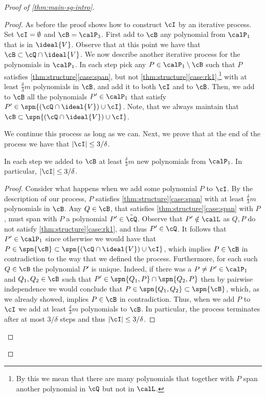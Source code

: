 \begin{proof}[Proof of \autoref{thm:main-sg-intro}]
\begin{proof}
As before the proof shows how to construct $\cI$ by an iterative process. 
Set $\cI= \emptyset$ and $\cB=\calP_3$. First add to $\cB$ any polynomial from $\calP_1$ that is in $\ideal{V}$. Observe that at this point we have that $\cB\subset \cQ\cap \ideal{V}$. We now describe another iterative process for the polynomials in $\calP_1$.
In each step pick any $P \in \calP_1\setminus \cB$ such that $P$ satisfies \autoref{thm:structure}\ref{case:span}, but not \autoref{thm:structure}\ref{case:rk1},\footnote{By this we mean that there are many polynomials that together with $P$ span another polynomial in $\cQ$ but not in $\calL$.} with at least $\frac{\delta}{3}m$ polynomials in $\cB$, and add it to both $\cI$ and to $\cB$. Then, we add to $\cB$ all the polynomials $P'\in\calP_1$ that satisfy $P' \in \spn{(\cQ \cap \ideal{V})  \cup \cI}$. Note, that we always maintain that  $\cB \subset \spn{(\cQ \cap \ideal{V})  \cup \cI}$.

We continue this process as long as we can.
Next, we prove that at the end of the process we have that $|\cI| \leq 3/\delta$.

\begin{claim}\label{cla:2nd-proc}
In each step we added to $\cB$ at least $\frac{\delta}{3}m$ new polynomials from $\calP_1$. In particular, $|\cI| \leq 3/\delta$.
\end{claim}
\begin{proof}
Consider what happens when we add some polynomial $P$ to $\cI$. By the description of our process, $P$ satisfies \autoref{thm:structure}\ref{case:span} with at least $\frac{\delta}{3}m$ polynomials in $\cB$. Any $Q\in  \cB$, that satisfies \autoref{thm:structure}\ref{case:span} with $P$,  must span with $P$ a polynomial $P'\in \tilde{\cQ}$. Observe that $P' \notin \calL$ as $Q,P$ do not satisfy \autoref{thm:structure}\ref{case:rk1}, and thus  $P'\in\cQ$. It follows that $P'\in \calP_1$ since otherwise we would have that $P\in \spn{\cB}\subset  \spn{(\cQ\cap \ideal{V}) \cup \cI}$, which implies $P\in\cB$ in contradiction to the way that we defined the process.
Furthermore, for each such $Q\in \cB$ the polynomial $P'$ is unique. Indeed, if there was a $P\neq P'\in\calP_1$ and $Q_1,Q_2\in  \cB$ such that $P'\in \spn{Q_1,P}\cap\spn{Q_2,P}$ then by pairwise independence we would conclude that $P\in \spn{Q_1,Q_2}\subset \spn{\cB}$, which, as we already showed, implies $P\in\cB$ in contradiction. Thus, when we add $P$ to $\cI$ we add at least $\frac{\delta}{3}m$ polynomials  to $\cB$. In particular, the process terminates after at most $3/\delta$ steps and thus $|\cI|\leq 3/\delta$.
\end{proof} 




\end{proof}
\end{proof}
